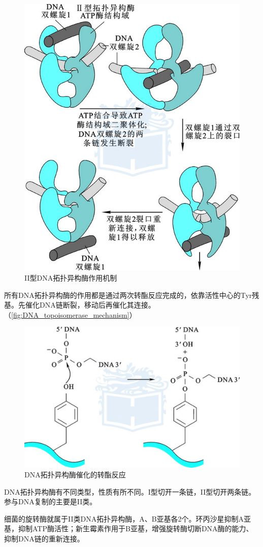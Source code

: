 \begin{figure}[h]
	\centering
	\includegraphics[width=0.7\linewidth]{Pics/DNA拓扑异构酶}
	\caption{II型DNA拓扑异构酶作用机制}
	\label{fig:DNA_topoisomerase}
\end{figure}

所有DNA拓扑异构酶的作用都是通过两次转酯反应完成的，依靠活性中心的Tyr残基。先催化DNA链断裂，移动后再催化其连接。（\autoref{fig:DNA_topoisomerase_mechanism}）

\begin{figure}[h]
	\centering
	\includegraphics[width=0.7\linewidth]{Pics/DNA拓扑异构酶机理}
	\caption{DNA拓扑异构酶催化的转酯反应}
	\label{fig:DNA_topoisomerase_mechanism}
\end{figure}

DNA拓扑异构酶有不同类型，性质有所不同。I型切开一条链，II型切开两条链。参与DNA复制的主要是II类。

细菌的旋转酶就属于II类DNA拓扑异构酶，A、B亚基各2个。环丙沙星抑制A亚基，抑制ATP酶活性；新生霉素作用于B亚基，增强旋转酶切断DNA酶的能力、抑制DNA链的重新连接。

